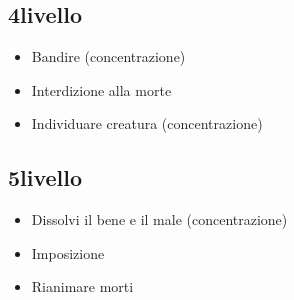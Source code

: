 \documentclass[a4paper,10pt,twoside,twocolumn,openany,bg=full,nodeprecatedcode]{dndbook}
\begin{document}
\subsection{4\degree livello}
\begin{itemize}
  \item Bandire (concentrazione)
  \item Interdizione alla morte
  \item Individuare creatura (concentrazione)
\end{itemize}

\subsection{5\degree livello}
\begin{itemize}
  \item Dissolvi il bene e il male (concentrazione)
  \item Imposizione
  \item Rianimare morti
\end{itemize}
\end{document}
